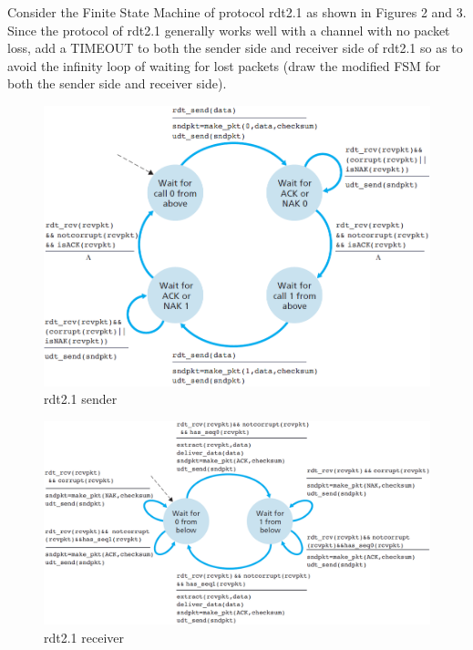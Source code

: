 \documentclass[10pt,letterpaper]{article}
\begin{document}
Consider the Finite State Machine of protocol rdt2.1 as shown in Figures 2 and 3. Since the protocol of rdt2.1 generally works well with a channel with no packet loss, add a TIMEOUT to both the sender side and receiver side of rdt2.1 so as to avoid the infinity loop of waiting for lost packets (draw the modified FSM for both the sender side and receiver side).
\begin{figure}[ht]
\centering
\includegraphics[width=150mm]{rdtsender}
\caption{rdt2.1 sender}
\end{figure}
\begin{figure}[ht]
\centering
\includegraphics[width=150mm]{rdtrecv}
\caption{rdt2.1 receiver}
\end{figure}
\end{document}
